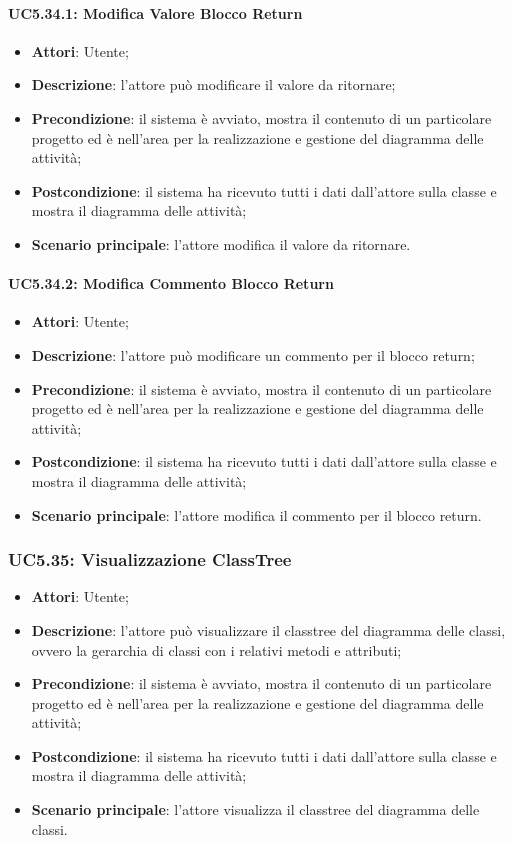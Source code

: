 \paragraph{UC5.34.1: Modifica Valore Blocco Return}
\label{UC5.34.1}
\begin{itemize}
	\item \textbf{Attori}: Utente;
	\item \textbf{Descrizione}: l'attore può modificare il valore da ritornare;
	\item \textbf{Precondizione}: il sistema è avviato, mostra il contenuto di un particolare progetto ed è nell'area per la realizzazione e gestione del diagramma delle attività;
	\item \textbf{Postcondizione}: il sistema ha ricevuto tutti i dati dall'attore sulla classe e mostra il diagramma delle attività;
	\item \textbf{Scenario principale}: l'attore modifica il valore da ritornare.
\end{itemize}

\paragraph{UC5.34.2: Modifica Commento Blocco Return}
\label{UC5.34.2}
\begin{itemize}
	\item \textbf{Attori}: Utente;
	\item \textbf{Descrizione}: l'attore può modificare un commento per il blocco return;
	\item \textbf{Precondizione}: il sistema è avviato, mostra il contenuto di un particolare progetto ed è nell'area per la realizzazione e gestione del diagramma delle attività;
	\item \textbf{Postcondizione}: il sistema ha ricevuto tutti i dati dall'attore sulla classe e mostra il diagramma delle attività;
	\item \textbf{Scenario principale}: l'attore modifica il commento per il blocco return.
\end{itemize}

\subsubsection{UC5.35: Visualizzazione ClassTree}
\label{UC5.35}
\begin{itemize}
	\item \textbf{Attori}: Utente;
	\item \textbf{Descrizione}: l'attore può visualizzare il classtree del diagramma delle classi, ovvero la gerarchia di classi con i relativi metodi e attributi;
	\item \textbf{Precondizione}: il sistema è avviato, mostra il contenuto di un particolare progetto ed è nell'area per la realizzazione e gestione del diagramma delle attività;
	\item \textbf{Postcondizione}: il sistema ha ricevuto tutti i dati dall'attore sulla classe e mostra il diagramma delle attività;
	\item \textbf{Scenario principale}: l'attore visualizza il classtree del diagramma delle classi.
\end{itemize}

